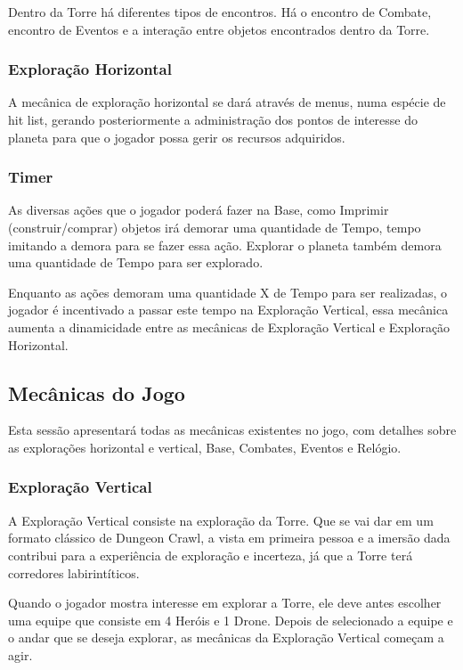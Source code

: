 \documentclass[11pt]{article} %
\begin{document}
Dentro da Torre há diferentes tipos de encontros. Há o encontro de Combate, encontro de Eventos e a interação entre objetos encontrados dentro da Torre.

\subsubsection{Exploração Horizontal}
A mecânica de exploração horizontal se dará através de menus, numa espécie de hit list, gerando posteriormente a administração dos pontos de interesse do planeta para que o jogador possa gerir os recursos adquiridos.

\subsubsection{Timer}
As diversas ações que o jogador poderá fazer na Base, como Imprimir (construir/comprar) objetos irá demorar uma quantidade de Tempo, tempo imitando a demora para se fazer essa ação. Explorar o planeta também demora uma quantidade de Tempo para ser explorado.

Enquanto as ações demoram uma quantidade X de Tempo para ser realizadas, o jogador é incentivado a passar este tempo na Exploração Vertical, essa mecânica aumenta a dinamicidade entre as mecânicas de Exploração Vertical e Exploração Horizontal.

\subsection{Mecânicas do Jogo}
Esta sessão apresentará todas as mecânicas existentes no jogo, com detalhes sobre as explorações horizontal e vertical, Base, Combates, Eventos e Relógio.

\subsubsection{Exploração Vertical}
A Exploração Vertical consiste na exploração da Torre. Que se vai dar em um formato clássico de Dungeon Crawl, a vista em primeira pessoa e a imersão dada contribui para a experiência de exploração e incerteza, já que a Torre terá corredores labirintíticos.

Quando o jogador mostra interesse em explorar a Torre, ele deve antes escolher uma equipe que consiste em 4 Heróis e 1 Drone. Depois de selecionado a equipe e o andar que se deseja explorar, as mecânicas da Exploração Vertical começam a agir.
\end{document}
